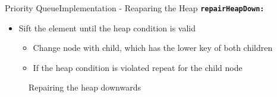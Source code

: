\begin{frame}{Priority Queue}{Implementation - Reaparing the Heap}
  {\color{Mittel-Blau}\texttt{\textbf{repairHeapDown:}}}
  \begin{itemize}
    \item
      {\color{Mittel-Blau}Sift} the element until the
      {\color{Mittel-Blau}heap condition} is valid
      \begin{itemize}
        \item
          Change node with child, which has the lower key of both children
        \item
          If the {\color{Mittel-Blau}heap condition} is violated repeat for
          the child node
      \end{itemize}
  \end{itemize}
  \begin{figure}[!h]%
    \begin{columns}%
      \begin{column}{0.45\linewidth}%
        \begin{adjustbox}{width=\linewidth}%
        \end{adjustbox}%
      \end{column}%
      \begin{column}{0.45\linewidth}%
        \begin{adjustbox}{width=\linewidth}%
        \end{adjustbox}%
      \end{column}%
    \end{columns}%
    \caption{Repairing the heap downwards}%
    \label{fig:priority_queue:impl_repair_heap_down}%
  \end{figure}
\end{frame}


